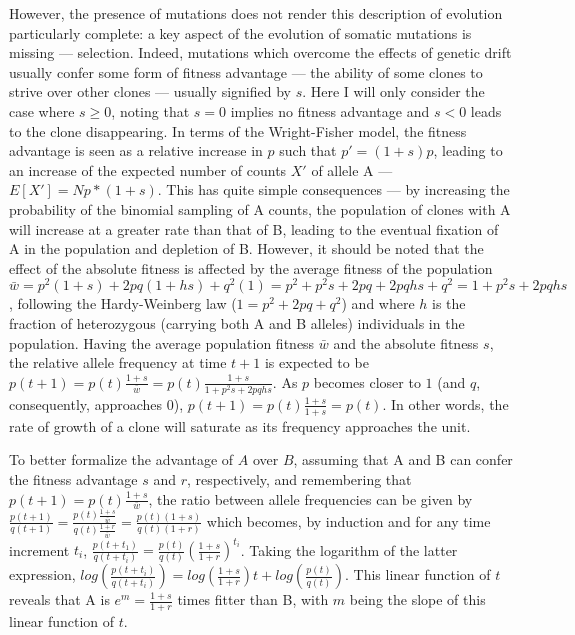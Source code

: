 However, the presence of mutations does not render this description of evolution particularly complete: a key aspect of the evolution of somatic mutations is missing --- selection. Indeed, mutations which overcome the effects of genetic drift usually confer some form of fitness advantage --- the ability of some clones to strive over other clones --- usually signified by $s$. Here I will only consider the case where $s \geq 0$, noting that $s = 0$ implies no fitness advantage and $s < 0$ leads to the clone disappearing. In terms of the Wright-Fisher model, the fitness advantage is seen as a relative increase in $p$ such that $p' = (1+s)p$, leading to an increase of the expected number of counts $X'$ of allele A --- $E[X'] = Np*(1+s)$. This has quite simple consequences --- by increasing the probability of the binomial sampling of A counts, the population of clones with A will increase at a greater rate than that of B, leading to the eventual fixation of A in the population and depletion of B. However, it should be noted that the effect of the absolute fitness is affected by the average fitness of the population $\bar{w} = p^2(1+s) + 2pq(1+hs) + q^2(1) = p^2 + p^2s + 2pq + 2pqhs + q^2 = 1 + p^2s + 2pqhs$, following the Hardy-Weinberg law ($1 = p^2 + 2pq + q^2$) and where $h$ is the fraction of heterozygous (carrying both A and B alleles) individuals in the population. Having the average population fitness $\bar{w}$ and the absolute fitness $s$, the relative allele frequency at time $t+1$ is expected to be $p(t+1) = p(t)\frac{1+s}{\bar{w}} = p(t)\frac{1+s}{1 + p^2s + 2pqhs}$. As $p$ becomes closer to $1$ (and $q$, consequently, approaches $0$), $p(t+1) = p(t)\frac{1+s}{1+s} = p(t)$. In other words, the rate of growth of a clone will saturate as its frequency approaches the unit.

To better formalize the advantage of $A$ over $B$, assuming that A and B can confer the fitness advantage $s$ and $r$, respectively, and remembering that $p(t+1) = p(t)\frac{1+s}{\bar{w}}$, the ratio between allele frequencies can be given by $\frac{p(t+1)}{q(t+1)} = \frac{p(t)\frac{1+s}{\bar{w}}}{q(t)\frac{1+r}{\bar{w}}} = \frac{p(t)(1+s)}{q(t)(1+r)}$ which becomes, by induction and for any time increment $t_i$, $\frac{p(t+t_1)}{q(t+t_i)}=\frac{p(t)}{q(t)}(\frac{1+s}{1+r})^{t_i}$. Taking the logarithm of the latter expression, $log(\frac{p(t+t_i)}{q(t+t_i)}) = log(\frac{1+s}{1+r})t + log(\frac{p(t)}{q(t)})$. This linear function of $t$ reveals that A is $e^{m} = \frac{1+s}{1+r}$ times fitter than B, with $m$ being the slope of this linear function of $t$. 

